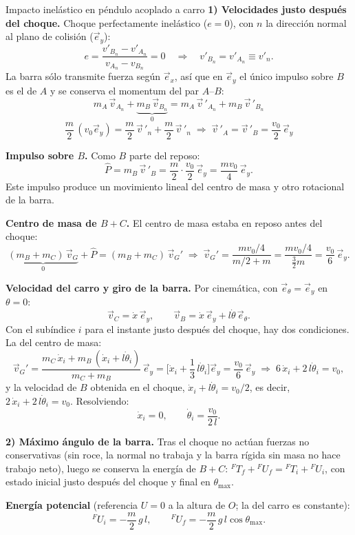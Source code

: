 \begin{solucion}{Impacto inelástico en péndulo acoplado a carro}
\medskip
\textbf{1) Velocidades justo después del choque.}
Choque perfectamente inelástico ($e=0$), con $n$ la dirección normal al plano de colisión ($\vec{e}_y$):
$$e=\frac{v'_{B_n}-v'_{A_n}}{v_{A_n}-v_{B_n}}=0\quad\Rightarrow\quad v'_{B_n}=v'_{A_n}\equiv v'_n .$$
La barra sólo transmite fuerza según $\vec{e}_x$, así que en $\vec{e}_y$ el único impulso sobre $B$ es el de $A$ y se conserva el momentum del par $A$--$B$:
$$m_A\,\vec{v}_{A_n}+\underbrace{m_B\,\vec{v}_{B_n}}_{0}=m_A\,\vec{v}\,'_{A_n}+m_B\,\vec{v}\,'_{B_n}$$
$$\frac m2\,(v_0\vec{e}_y)=\frac m2\,\vec{v}\,'_n+\frac m2\,\vec{v}\,'_n
\;\Rightarrow\; \vec{v}\,'_A=\vec{v}\,'_B=\frac{v_0}{2}\,\vec{e}_y$$
 
\textbf{Impulso sobre $B$.} Como $B$ parte del reposo:
$$\hat P=m_B\,\vec{v}\,'_B=\frac m2\cdot\frac{v_0}{2}\,\vec{e}_y=\frac{m v_0}{4}\,\vec{e}_y .$$
Este impulso produce un movimiento lineal del centro de masa y otro rotacional de la barra.
 
\textbf{Centro de masa de $B+C$.} El centro de masa estaba en reposo antes del choque:
$$\underbrace{(m_B+m_C)\,\vec{v}_G}_{0}+\hat P=(m_B+m_C)\,\vec{v}_G'
\;\Rightarrow\;
\vec{v}_G'=\frac{m v_0/4}{m/2+m}=\frac{m v_0/4}{\tfrac32 m}=\frac{v_0}{6}\,\vec{e}_y .$$
 
\textbf{Velocidad del carro y giro de la barra.} Por cinemática, con $\vec{e}_{\theta}=\vec{e}_y$ en $\theta=0$:
$$\vec{v}_C=\dot x\,\vec{e}_y,\qquad \vec{v}_B=\dot x\,\vec{e}_y+l\dot\theta\,\vec{e}_{\theta} .$$
Con el subíndice $i$ para el instante justo después del choque, hay dos condiciones. La del centro de masa:
$$ \vec{v}_G'=\frac{m_C\,\dot x_i+m_B\,(\dot x_i+l\dot\theta_i)}{m_C+m_B}\,\vec{e}_y=\Big[\dot x_i+\frac13\,l\dot\theta_i\Big]\vec{e}_y=\frac{v_0}{6}\,\vec{e}_y
\;\Rightarrow\; 6\,\dot x_i+2\,l\dot\theta_i=v_0 ,$$
y la velocidad de $B$ obtenida en el choque, $\dot x_i+l\dot\theta_i=v_0/2$, es decir, $2\,\dot x_i+2\,l\dot\theta_i=v_0$. Resolviendo:
$$\dot x_i=0,\qquad \dot\theta_i=\frac{v_0}{2\,l}.$$
 
\medskip
\textbf{2) Máximo ángulo de la barra.}
Tras el choque no actúan fuerzas no conservativas (sin roce, la normal no trabaja y la barra rígida sin masa no hace trabajo neto), luego se conserva la energía de $B+C$: ${}^{F}T_f+{}^{F}U_f={}^{F}T_i+{}^{F}U_i$, con estado inicial justo después del choque y final en $\theta_{\max}$.
 
\textbf{Energía potencial} (referencia $U=0$ a la altura de $O$; la del carro es constante):
$${}^{F}U_i=-\frac m2\,g\,l,\qquad {}^{F}U_f=-\frac m2\,g\,l\cos\theta_{\max}.$$
 

\end{solucion}
